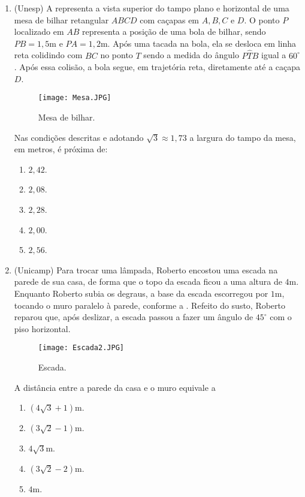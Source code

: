 \begin{enumerate}
\item {}
(Unesp) A  representa a vista superior do tampo plano e horizontal de uma mesa de bilhar retangular $ABCD$ com caçapas  em $A, B, C$ e $D$. O ponto $P$  localizado em $AB$  representa a posição de uma bola de bilhar, sendo $PB=1,5$m   e $PA=1,2$m. Após uma tacada na bola, ela se desloca em linha reta colidindo com $BC$  no ponto $T$  sendo a medida do ângulo $P\hat{T}B$  igual a $60^\circ$. Após essa colisão, a bola segue, em trajetória reta, diretamente até a caçapa $D$. 
\begin{figure}[H]
    \centering
    \texttt{[image: Mesa.JPG]}
    \caption{Mesa de bilhar.}
    \label{Mesa}
\end{figure}
Nas condições descritas e adotando $\sqrt{3} \approx 1,73$   a largura do tampo da mesa, em metros, é próxima de: 
\begin{enumerate}
    \item $2,42$.
    \item $2,08$.
    \item $2,28$.
    \item $2,00$.
    \item $2,56$.
\end{enumerate} 

\item{}
(Unicamp) Para trocar uma lâmpada, Roberto encostou uma escada na parede de sua casa, de forma que o topo da escada ficou a uma altura de $4$m. Enquanto Roberto subia os degraus, a base da escada escorregou por $1$m, tocando o muro paralelo à parede, conforme a . Refeito do susto, Roberto reparou que, após deslizar, a escada passou a fazer um ângulo de $45^\circ$ com o piso horizontal. 
\begin{figure}[H]
    \centering
    \texttt{[image: Escada2.JPG]}
    \caption{Escada.}
    \label{Escada2}
\end{figure}
A distância entre a parede da casa e o muro equivale a
\begin{enumerate}
    \item $(4\sqrt{3}+1)$m.
    \item $(3\sqrt{2}-1)$m.
    \item $4\sqrt{3}$m.
    \item $(3\sqrt{2}-2)$m.
    \item $4$m.
\end{enumerate} 


\end{enumerate}
